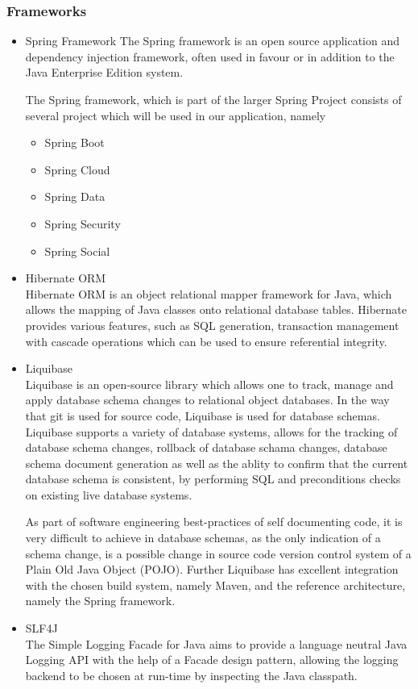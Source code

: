 \documentclass[a4paper,10pt]{article}
\begin{document}
\subsubsection{Frameworks}
		\begin{itemize}
			\item Spring Framework
				The Spring framework is an open source application and dependency injection framework, often used in favour or in addition to the Java Enterprise Edition system.
				
				The Spring framework, which is part of the larger Spring Project consists of several project which will be used in our application, namely
					\begin{itemize}
						\item Spring Boot
						\item Spring Cloud
						\item Spring Data
						\item Spring Security
						\item Spring Social
					\end{itemize}
			\item Hibernate ORM\\
				Hibernate ORM is an object relational mapper framework for Java, which allows the mapping of Java classes onto relational database tables. Hibernate provides various features, such as SQL generation, transaction management with cascade operations which can be used to ensure  referential integrity.
			\item Liquibase\\
				Liquibase is an open-source library which allows one to track, manage and apply database schema changes to relational object databases. In the way that git is used for source code, Liquibase is used for database schemas.  Liquibase supports a variety of database systems, allows for the tracking of database schema changes, rollback of database schama changes, database schema document generation as well as the ablity to confirm that the current database schema is consistent, by performing SQL and preconditions checks on existing live database systems.

				As part of software engineering best-practices of self documenting code, it is very difficult to achieve in database schemas, as the only indication of a schema change, is a possible change in source code version control system of a Plain Old Java Object (POJO). Further Liquibase has excellent integration with the chosen build system, namely Maven, and the reference architecture, namely the Spring framework. 
			\item SLF4J\\
				The Simple Logging Facade for Java aims to provide a language neutral Java Logging API with the help of a Facade design pattern, allowing the logging backend to be chosen at run-time by inspecting the Java classpath.
				

\end{itemize}
\end{document}
